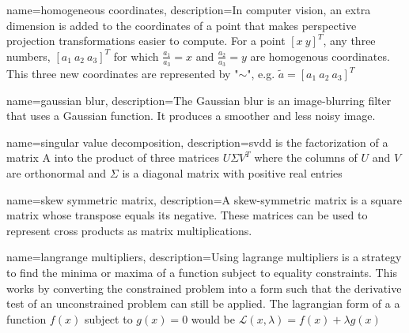 
{	
	name={homogeneous coordinates}, 
	description={In computer vision, an extra dimension is added to the coordinates of a point that makes perspective projection transformations easier to compute. For a point $[x \ y]^T$, any three numbers, $[a_1 \ a_2 \ a_3]^T$ for which $\frac{a_1}{a_3} = x$ and $\frac{a_2}{a_3} = y$ are homogenous coordinates. This three new coordinates are represented by "$\sim$", e.g. $\widetilde{a} = [a_1 \ a_2 \ a_3]^T$}
}

{	
	name={gaussian blur}, 
	description={The Gaussian blur is an image-blurring filter that uses a Gaussian function. It produces a smoother and less noisy image.}
}

{
	name={singular value decomposition},
	description={\acrfull{svdd} is  the  factorization  of a matrix A into  the product of three matrices $U$$\Sigma$$V^T$   where the columns of $U$ and $V$ are orthonormal and $\Sigma$ is a diagonal matrix with positive real entries}
}

{
	name={skew symmetric matrix},
	description={A skew-symmetric matrix is a square matrix whose transpose equals its negative. These matrices can be used to represent cross products as matrix multiplications.}
}

{
	name={langrange multipliers},
	description={Using lagrange multipliers is a strategy to find the minima or maxima of a function subject to equality constraints. This works by converting the constrained problem into a form such that the derivative test of an unconstrained problem can still be applied. The lagrangian form of a a function $f(x)$ subject to $g(x) = 0$ would be $\mathcal{L}(x, \lambda)=f(x)+\lambda g(x)$}
}

